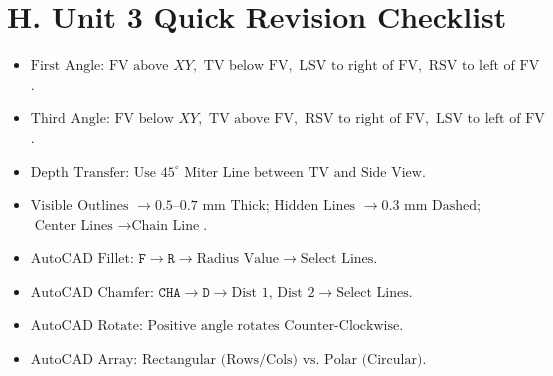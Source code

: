 \section{H. Unit 3 Quick Revision Checklist}
\begin{revisionchecklist}
\begin{itemize}
    \item $\text{First Angle: } \text{FV above } XY, \text{ TV below FV}, \text{ LSV to right of FV}, \text{ RSV to left of FV}$.
    \item $\text{Third Angle: } \text{FV below } XY, \text{ TV above FV}, \text{ RSV to right of FV}, \text{ LSV to left of FV}$.
    \item $\text{Depth Transfer: } \text{Use } 45^\circ \text{ Miter Line between TV and Side View}$.
    \item $\text{Visible Outlines } \to 0.5\text{--}0.7\text{ mm Thick}$; $\text{Hidden Lines } \to 0.3\text{ mm Dashed}$; $\text{Center Lines } \to \text{Chain Line}$.
    \item $\text{AutoCAD Fillet: } \texttt{F} \to \texttt{R} \to \text{Radius Value} \to \text{Select Lines}$.
    \item $\text{AutoCAD Chamfer: } \texttt{CHA} \to \texttt{D} \to \text{Dist 1, Dist 2} \to \text{Select Lines}$.
    \item $\text{AutoCAD Rotate: } \text{Positive angle rotates Counter-Clockwise}$.
    \item $\text{AutoCAD Array: } \text{Rectangular (Rows/Cols) vs. Polar (Circular)}$.
\end{itemize}
\end{revisionchecklist}
